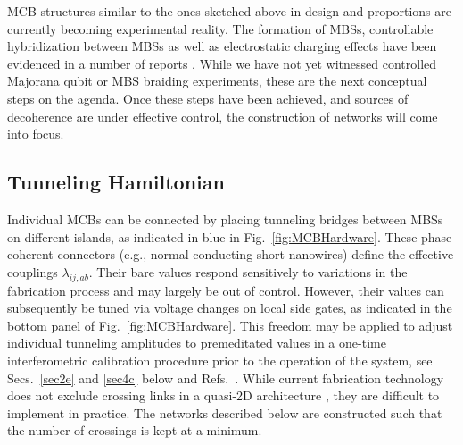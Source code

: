 \documentclass[twocolumn,floats,prx,showpacs]{revtex4-1}
\begin{document}
MCB structures similar to the ones sketched above in design and proportions are currently becoming experimental reality. The formation of MBSs, controllable hybridization between MBSs as well as electrostatic charging effects have been evidenced in a number of reports \cite{Mourik2012,Albrecht2016,Deng2016,Nichele2017,Gazi2017,Zhang2018}. While we have not yet witnessed controlled Majorana qubit or MBS braiding experiments, these are the next conceptual steps on the agenda. Once these steps have been achieved, and sources of decoherence are under effective
control, the construction of networks will come into focus.  

\subsection{Tunneling Hamiltonian}\label{sec2b}

Individual MCBs can be connected by placing tunneling bridges between MBSs on different islands, as indicated in blue in Fig.~\ref{fig:MCBHardware}. These phase-coherent connectors (e.g., normal-conducting short nanowires) define the effective couplings $\lambda_{ij,ab}$. Their bare values respond sensitively to variations in the fabrication process and may largely be out of control. However, their values can subsequently be tuned via voltage changes on local side gates, as indicated in the bottom panel of Fig.~\ref{fig:MCBHardware}. This freedom may be applied to adjust individual tunneling amplitudes to premeditated values in a one-time interferometric  calibration procedure prior to the operation of the system,
see Secs.~\ref{sec2e} and \ref{sec4c} below and Refs.~\cite{Fu2010,PhysRevLett.116.050501,Plugge2017,Karzig2017}.  
While current fabrication technology does not exclude crossing links in a quasi-2D architecture \cite{Lutchyn2018}, they are difficult to implement in practice. The networks described below are constructed such that the number of crossings is kept at a minimum.
\end{document}
